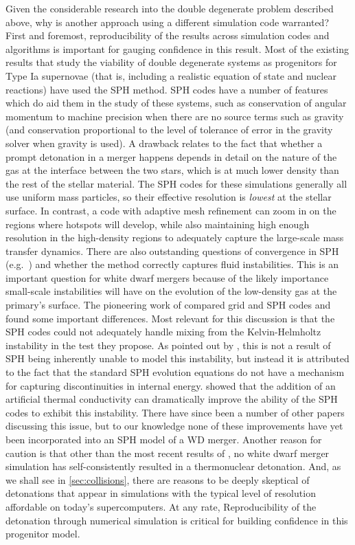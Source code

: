 \documentclass[12pt]{article}
\begin{document}
Given the considerable research into the double degenerate problem 
described above, why is another approach using a different simulation
code warranted? First and foremost, reproducibility of the results
across simulation codes and algorithms is important for gauging
confidence in this result. Most of the existing results that study 
the viability of double degenerate systems as progenitors for
Type Ia supernovae (that is, including a realistic 
equation of state and nuclear reactions) have
used the SPH method. SPH codes have a number of features which do aid
them in the study of these systems, such as conservation of
angular momentum to machine precision when there are no source terms
such as gravity (and conservation proportional to the level of
tolerance of error in the gravity solver when gravity is used).
A drawback relates to the fact that whether a prompt detonation
in a merger happens depends in detail on the nature of the
gas at the interface between the two stars, which is at much lower
density than the rest of the stellar material. The SPH codes for these
simulations generally all use
uniform mass particles, so their effective resolution is
\textit{lowest} at the stellar surface. In contrast, a code
with adaptive mesh refinement can zoom in on the regions where
hotspots will develop, while also maintaining high enough resolution
in the high-density regions to adequately capture the large-scale mass
transfer dynamics. There are also outstanding questions of
convergence in SPH (e.g.\ \citealt{zhu-SPH:2014}) and whether the method
correctly captures fluid instabilities. This is an important question
for white dwarf mergers because of the likely importance small-scale
instabilities will have on the evolution of the low-density gas at the
primary's surface. The pioneering work of \cite{agertz:2007} compared
grid and SPH codes and found some important differences. Most relevant
for this discussion is that the SPH codes could not adequately handle
mixing from the Kelvin-Helmholtz instability in the test they
propose. As pointed out by \cite{price:2008}, this is not a result of
SPH being inherently unable to model this instability, but instead it
is attributed to the fact that the standard SPH evolution equations do
not have a mechanism for capturing discontinuities in internal
energy. \citeauthor{price:2008} showed that the addition of an
artificial thermal conductivity can dramatically improve the ability
of the SPH codes to exhibit this instability. There have since been a
number of other papers discussing this issue, but to our knowledge
none of these improvements have yet been incorporated into an SPH
model of a WD merger. Another reason for caution is that other than the
most recent results of \cite{kashyap:2015}, no white dwarf merger
simulation has self-consistently resulted in a thermonuclear detonation.
And, as we shall see in \autoref{sec:collisions}, there are reasons to be
deeply skeptical of detonations that appear in simulations with the typical
level of resolution affordable on today's supercomputers. At any rate,
Reproducibility of the detonation through numerical simulation is critical
for building confidence in this progenitor model.
\end{document}

